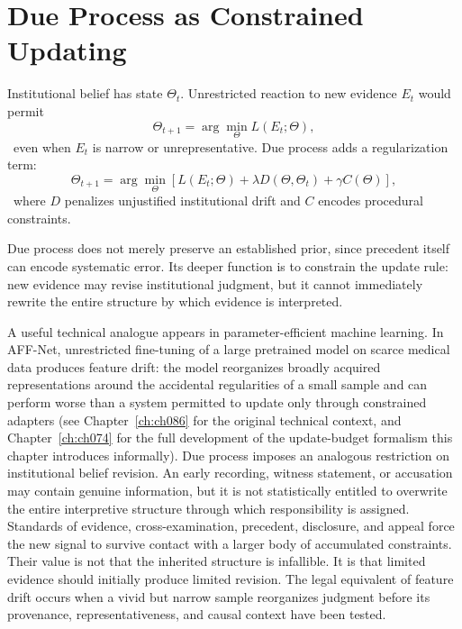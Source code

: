 
\chapter{Due Process as Constrained Updating}
\label{ch:ch044}

Institutional belief has state \(\Theta_t\). Unrestricted reaction to new evidence \(E_t\) would permit
\[
\Theta_{t+1} = \arg\min_\Theta L(E_t;\Theta),
\]
\ToyModel\ even when \(E_t\) is narrow or unrepresentative.
Due process adds a regularization term:
\[
\Theta_{t+1} = \arg\min_\Theta \left[ L(E_t;\Theta) + \lambda D(\Theta,\Theta_t) + \gamma C(\Theta) \right],
\]
\ToyModel\ where \(D\) penalizes unjustified institutional drift and \(C\) encodes procedural constraints.

Due process does not merely preserve an established prior, since precedent itself can encode systematic error. Its deeper function is to constrain the update rule: new evidence may revise institutional judgment, but it cannot immediately rewrite the entire structure by which evidence is interpreted.

A useful technical analogue appears in parameter-efficient machine learning. In AFF-Net, unrestricted fine-tuning of a large pretrained model on scarce medical data produces feature drift: the model reorganizes broadly acquired representations around the accidental regularities of a small sample and can perform worse than a system permitted to update only through constrained adapters (see Chapter~\ref{ch:ch086} for the original technical context, and Chapter~\ref{ch:ch074} for the full development of the update-budget formalism this chapter introduces informally). Due process imposes an analogous restriction on institutional belief revision. An early recording, witness statement, or accusation may contain genuine information, but it is not statistically entitled to overwrite the entire interpretive structure through which responsibility is assigned. Standards of evidence, cross-examination, precedent, disclosure, and appeal force the new signal to survive contact with a larger body of accumulated constraints. Their value is not that the inherited structure is infallible. It is that limited evidence should initially produce limited revision. The legal equivalent of feature drift occurs when a vivid but narrow sample reorganizes judgment before its provenance, representativeness, and causal context have been tested.

